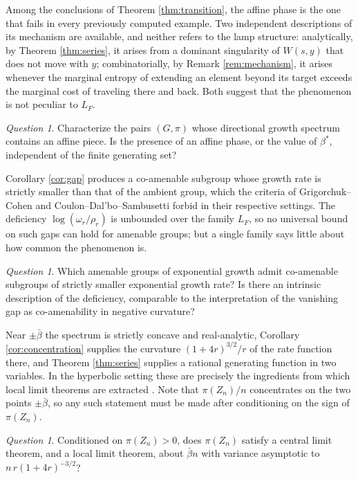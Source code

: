 \documentclass[11pt]{amsart}
\theoremstyle{definition}
\theoremstyle{remark}
\newtheorem{question}[theorem]{Question}
\begin{document}
Among the conclusions of Theorem \ref{thm:transition}, the affine phase is the one that fails in every previously computed example. Two independent descriptions of its mechanism are available, and neither refers to the lamp structure: analytically, by Theorem \ref{thm:series}, it arises from a dominant singularity of $W(s,y)$ that does not move with $y$; combinatorially, by Remark \ref{rem:mechanism}, it arises whenever the marginal entropy of extending an element beyond its target exceeds the marginal cost of traveling there and back. Both suggest that the phenomenon is not peculiar to $L_F$.

\begin{question}\label{q:affine}
Characterize the pairs $(G,\pi)$ whose directional growth spectrum contains an affine piece. Is the presence of an affine phase, or the value of $\beta^{*}$, independent of the finite generating set?
\end{question}

Corollary \ref{cor:gap} produces a co-amenable subgroup whose growth rate is strictly smaller than that of the ambient group, which the criteria of Grigorchuk--Cohen \cite{Grigorchuk80,Cohen82} and Coulon--Dal'bo--Sambusetti \cite{CDS18} forbid in their respective settings. The deficiency $\log(\omega_r/\rho_r)$ is unbounded over the family $L_F$, so no universal bound on such gaps can hold for amenable groups; but a single family says little about how common the phenomenon is.

\begin{question}\label{q:gap}
Which amenable groups of exponential growth admit co-amenable subgroups of strictly smaller exponential growth rate? Is there an intrinsic description of the deficiency, comparable to the interpretation of the vanishing gap as co-amenability in negative curvature?
\end{question}

Near $\pm\bar\beta$ the spectrum is strictly concave and real-analytic, Corollary \ref{cor:concentration} supplies the curvature $(1+4r)^{3/2}/r$ of the rate function there, and Theorem \ref{thm:series} supplies a rational generating function in two variables. In the hyperbolic setting these are precisely the ingredients from which local limit theorems are extracted \cite{Sharp01}. Note that $\pi(Z_n)/n$ concentrates on the two points $\pm\bar\beta$, so any such statement must be made after conditioning on the sign of $\pi(Z_n)$.

\begin{question}\label{q:clt}
Conditioned on $\pi(Z_n)>0$, does $\pi(Z_n)$ satisfy a central limit theorem, and a local limit theorem, about $\bar\beta n$ with variance asymptotic to $n\,r(1+4r)^{-3/2}$?
\end{question}
\end{document}
